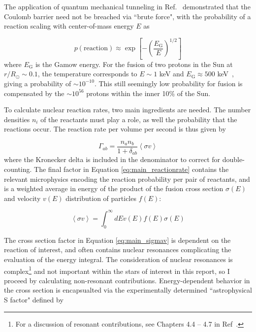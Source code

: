 \documentclass[12pt]{article}
\newcommand{\bigparenthesis}[1]{\left(#1\right)}
\begin{document}
The application of quantum mechanical tunneling in Ref.~\cite{Gamow1938} demonstrated that the Coulomb barrier need not be breached via ``brute force", with the probability of a reaction scaling with center-of-mass energy $E$ as

\begin{equation}
    p(\text{reaction}) \approx \exp\left[-\bigparenthesis{\frac{E_\mathrm{G}}{E}}^{1/2}\right]
\end{equation}
%
where $E_\mathrm{G}$ is the Gamow energy. For the fusion of two protons in the Sun at $r/R_\odot \sim 0.1$, the temperature corresponds to $E \sim 1$ keV and $E_\mathrm{G} \approx 500$ keV~\cite{Phillips1999}, giving a probability of $\sim 10^{-10}$. This still seemingly low probability for fusion is compensated by the $\sim 10^{56}$ protons within the inner 10\% of the Sun.

To calculate nuclear reaction rates, two main ingredients are needed. The number densities $n_i$ of the reactants must play a role, as well the probability that the reactions occur. The reaction rate per volume per second is thus given by

\begin{equation}
    \Gamma_{ab} = \frac{n_a n_b}{1 + \delta_{ab}} \left<\sigma v\right> \label{eq:main_reactionrate}
\end{equation}
%
where the Kronecker delta is included in the denominator to correct for double-counting. The final factor in Equation \ref{eq:main_reactionrate} contains the relevant microphysics encoding the reaction probability per pair of reactants, and is a weighted average in energy of the product of the fusion cross section $\sigma(E)$ and velocity $v(E)$ distribution of particles $f(E)$:

\begin{equation}
    \left< \sigma v \right> = \int_0^\infty dE v(E)f(E)\sigma(E)\label{eq:main_sigmav}
\end{equation} 


The cross section factor in Equation \ref{eq:main_sigmav} is dependent on the reaction of interest, and often contains nuclear resonances complicating the evaluation of the energy integral. The consideration of nuclear resonances is complex\footnote{For a discussion of resonant contributions, see Chapters 4.4 -- 4.7 in Ref~\cite{Cox_Giuli_vol1}.} and not important within the stars of interest in this report, so I proceed by calculating non-resonant contributions. Energy-dependent behavior in the cross section is encapsualted via the experimentally determined ``astrophysical S factor" defined by
\end{document}
